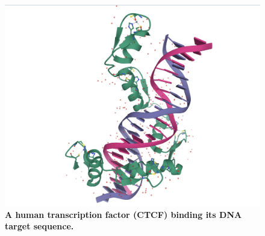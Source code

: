 \documentclass[a4paper, titlepage, openright]{book}
\begin{document}
\begin{figure}
	\centering
	\includegraphics[width=\textwidth]{figures/ctcf_dna.png}
	\caption[A human transcription factor (CTCF) binding its DNA target sequence.]{\textbf{A human transcription factor (CTCF) binding its DNA target sequence.}}
	\label{fig:ctcf_dna}
\end{figure}
\end{document}
